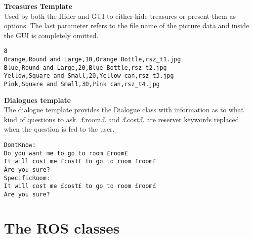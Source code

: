 \textbf{Treasures Template} \\
Used by both the Hider and GUI to either hide treasures or present them as options. The last parameter refers to the file name of the picture data and inside the GUI is completely omitted.
\begin{lstlisting}
8
Orange,Round and Large,10,Orange Bottle,rsz_t1.jpg
Blue,Round and Large,20,Blue Bottle,rsz_t2.jpg
Yellow,Square and Small,20,Yellow can,rsz_t3.jpg
Pink,Square and Small,30,Pink can,rsz_t4.jpg
\end{lstlisting}
\textbf{Dialogues template} \\
The dialogue template provides the Dialogue class with information as to what kind of questions to ask. £room£ and £cost£ are reserver keywords replaced when the question is fed to the user.
\begin{lstlisting}
DontKnow:
Do you want me to go to room £room£
It will cost me £cost£ to go to room £room£
Are you sure?
SpecificRoom:
It will cost me £cost£ to go to room £room£
Are you sure?
\end{lstlisting}

\section{The ROS classes}
